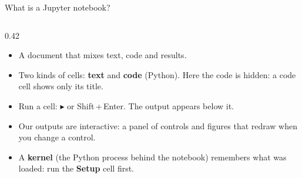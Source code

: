 \begin{frame}{What is a Jupyter notebook?}
\begin{columns}[c]
    \begin{column}{0.42\linewidth}\small
      \begin{itemize}\setlength\itemsep{3pt}
        \item A document that mixes \alert{text, code and results}.
        \item Two kinds of cells: \textbf{text} and \textbf{code} (Python). Here the code is \alert{hidden}: a code cell shows only its title.
        \item Run a cell: \alert{$\blacktriangleright$} or \alert{Shift\,+\,Enter}. The output appears below it.
        \item Our outputs are \alert{interactive}: a panel of controls and figures that redraw when you change a control.
        \item A \textbf{kernel} (the Python process behind the notebook) \alert{remembers} what was loaded: run the \textbf{Setup} cell first.
      \end{itemize}
    \end{column}
  \end{columns}
\end{frame}

